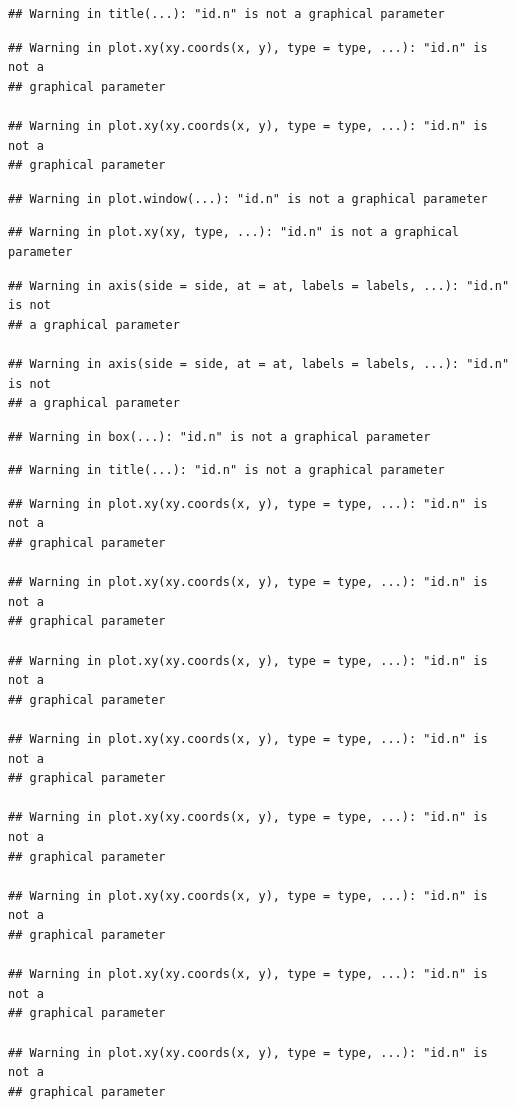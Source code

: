 \documentclass[]{book}
\begin{document}
\begin{verbatim}
## Warning in title(...): "id.n" is not a graphical parameter
\end{verbatim}

\begin{verbatim}
## Warning in plot.xy(xy.coords(x, y), type = type, ...): "id.n" is not a
## graphical parameter

## Warning in plot.xy(xy.coords(x, y), type = type, ...): "id.n" is not a
## graphical parameter
\end{verbatim}

\begin{verbatim}
## Warning in plot.window(...): "id.n" is not a graphical parameter
\end{verbatim}

\begin{verbatim}
## Warning in plot.xy(xy, type, ...): "id.n" is not a graphical parameter
\end{verbatim}

\begin{verbatim}
## Warning in axis(side = side, at = at, labels = labels, ...): "id.n" is not
## a graphical parameter

## Warning in axis(side = side, at = at, labels = labels, ...): "id.n" is not
## a graphical parameter
\end{verbatim}

\begin{verbatim}
## Warning in box(...): "id.n" is not a graphical parameter
\end{verbatim}

\begin{verbatim}
## Warning in title(...): "id.n" is not a graphical parameter
\end{verbatim}

\begin{verbatim}
## Warning in plot.xy(xy.coords(x, y), type = type, ...): "id.n" is not a
## graphical parameter

## Warning in plot.xy(xy.coords(x, y), type = type, ...): "id.n" is not a
## graphical parameter

## Warning in plot.xy(xy.coords(x, y), type = type, ...): "id.n" is not a
## graphical parameter

## Warning in plot.xy(xy.coords(x, y), type = type, ...): "id.n" is not a
## graphical parameter

## Warning in plot.xy(xy.coords(x, y), type = type, ...): "id.n" is not a
## graphical parameter

## Warning in plot.xy(xy.coords(x, y), type = type, ...): "id.n" is not a
## graphical parameter

## Warning in plot.xy(xy.coords(x, y), type = type, ...): "id.n" is not a
## graphical parameter

## Warning in plot.xy(xy.coords(x, y), type = type, ...): "id.n" is not a
## graphical parameter
\end{verbatim}
\end{document}
